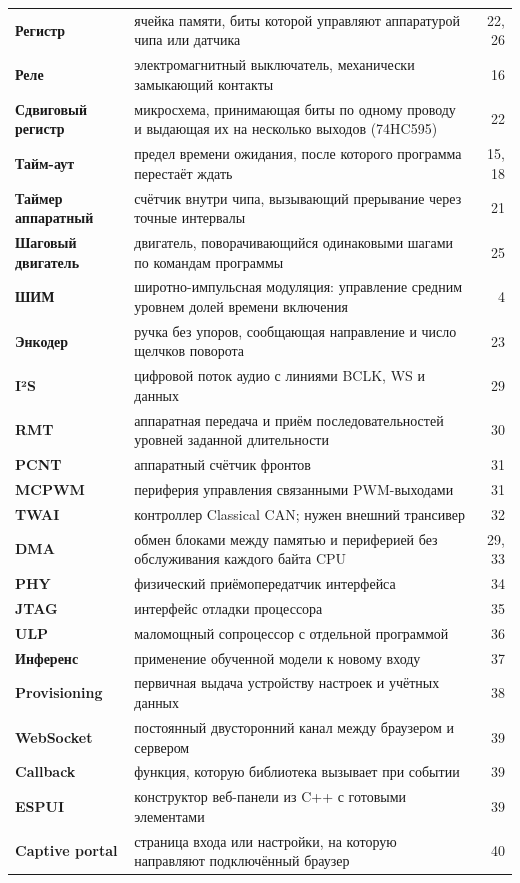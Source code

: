 {\begin{xltabular}{\textwidth}{@{}>{\bfseries}p{40mm} X r@{}}
Регистр & ячейка памяти, биты которой управляют аппаратурой чипа или датчика & 22, 26 \\
Реле & электромагнитный выключатель, механически замыкающий контакты & 16 \\
Сдвиговый регистр & микросхема, принимающая биты по одному проводу и выдающая их на несколько выходов (74HC595) & 22 \\
Тайм-аут & предел времени ожидания, после которого программа перестаёт ждать & 15, 18 \\
Таймер аппаратный & счётчик внутри чипа, вызывающий прерывание через точные интервалы & 21 \\
Шаговый двигатель & двигатель, поворачивающийся одинаковыми шагами по командам программы & 25 \\
ШИМ & широтно-импульсная модуляция: управление средним уровнем долей времени включения & 4 \\
Энкодер & ручка без упоров, сообщающая направление и число щелчков поворота & 23 \\
I²S & цифровой поток аудио с линиями BCLK, WS и данных & 29 \\
RMT & аппаратная передача и приём последовательностей уровней заданной длительности & 30 \\
PCNT & аппаратный счётчик фронтов & 31 \\
MCPWM & периферия управления связанными PWM-выходами & 31 \\
TWAI & контроллер Classical CAN; нужен внешний трансивер & 32 \\
DMA & обмен блоками между памятью и периферией без обслуживания каждого байта CPU & 29, 33 \\
PHY & физический приёмопередатчик интерфейса & 34 \\
JTAG & интерфейс отладки процессора & 35 \\
ULP & маломощный сопроцессор с отдельной программой & 36 \\
Инференс & применение обученной модели к новому входу & 37 \\
Provisioning & первичная выдача устройству настроек и учётных данных & 38 \\
WebSocket & постоянный двусторонний канал между браузером и сервером & 39 \\
Callback & функция, которую библиотека вызывает при событии & 39 \\
ESPUI & конструктор веб-панели из C++ с готовыми элементами & 39 \\
Captive portal & страница входа или настройки, на которую направляют подключённый браузер & 40 \\

\end{xltabular}}
